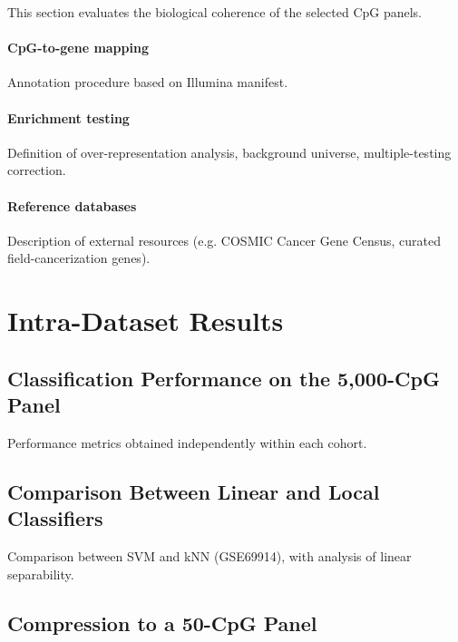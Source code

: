 This section evaluates the biological coherence
of the selected CpG panels.

\paragraph{CpG-to-gene mapping}
Annotation procedure based on Illumina manifest.

\paragraph{Enrichment testing}
Definition of over-representation analysis,
background universe,
multiple-testing correction.

\paragraph{Reference databases}
Description of external resources
(e.g. COSMIC Cancer Gene Census, curated field-cancerization genes).

\section{Intra-Dataset Results}

\subsection{Classification Performance on the 5,000-CpG Panel}

Performance metrics obtained independently within each cohort.

\subsection{Comparison Between Linear and Local Classifiers}

Comparison between SVM and kNN (GSE69914),
with analysis of linear separability.

\subsection{Compression to a 50-CpG Panel}

